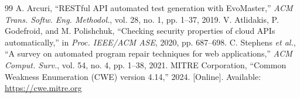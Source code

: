 \documentclass[journal,twoside]{IEEEtran}
\begin{document}
\begin{thebibliography}{99}
 A. Arcuri, ``RESTful API automated test generation with EvoMaster,'' \emph{ACM Trans. Softw. Eng. Methodol.}, vol. 28, no. 1, pp. 1--37, 2019.
 V. Atlidakis, P. Godefroid, and M. Polishchuk, ``Checking security properties of cloud APIs automatically,'' in \emph{Proc. IEEE/ACM ASE}, 2020, pp. 687--698.
 C. Stephens \emph{et al.}, ``A survey on automated program repair techniques for web applications,'' \emph{ACM Comput. Surv.}, vol. 54, no. 4, pp. 1--38, 2021.
 MITRE Corporation, ``Common Weakness Enumeration (CWE) version 4.14,'' 2024. [Online]. Available: \url{https://cwe.mitre.org}
\end{thebibliography}
\end{document}
